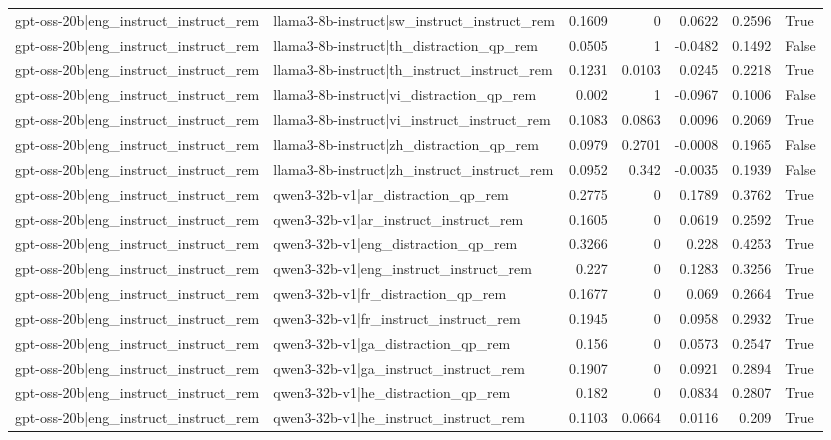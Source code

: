 \begin{table}
\begin{tabular}{l l r r r r l}
gpt-oss-20b|eng_instruct_instruct_rem & llama3-8b-instruct|sw_instruct_instruct_rem & 0.1609 & 0 & 0.0622 & 0.2596 & True \\
gpt-oss-20b|eng_instruct_instruct_rem & llama3-8b-instruct|th_distraction_qp_rem & 0.0505 & 1 & -0.0482 & 0.1492 & False \\
gpt-oss-20b|eng_instruct_instruct_rem & llama3-8b-instruct|th_instruct_instruct_rem & 0.1231 & 0.0103 & 0.0245 & 0.2218 & True \\
gpt-oss-20b|eng_instruct_instruct_rem & llama3-8b-instruct|vi_distraction_qp_rem & 0.002 & 1 & -0.0967 & 0.1006 & False \\
gpt-oss-20b|eng_instruct_instruct_rem & llama3-8b-instruct|vi_instruct_instruct_rem & 0.1083 & 0.0863 & 0.0096 & 0.2069 & True \\
gpt-oss-20b|eng_instruct_instruct_rem & llama3-8b-instruct|zh_distraction_qp_rem & 0.0979 & 0.2701 & -0.0008 & 0.1965 & False \\
gpt-oss-20b|eng_instruct_instruct_rem & llama3-8b-instruct|zh_instruct_instruct_rem & 0.0952 & 0.342 & -0.0035 & 0.1939 & False \\
gpt-oss-20b|eng_instruct_instruct_rem & qwen3-32b-v1|ar_distraction_qp_rem & 0.2775 & 0 & 0.1789 & 0.3762 & True \\
gpt-oss-20b|eng_instruct_instruct_rem & qwen3-32b-v1|ar_instruct_instruct_rem & 0.1605 & 0 & 0.0619 & 0.2592 & True \\
gpt-oss-20b|eng_instruct_instruct_rem & qwen3-32b-v1|eng_distraction_qp_rem & 0.3266 & 0 & 0.228 & 0.4253 & True \\
gpt-oss-20b|eng_instruct_instruct_rem & qwen3-32b-v1|eng_instruct_instruct_rem & 0.227 & 0 & 0.1283 & 0.3256 & True \\
gpt-oss-20b|eng_instruct_instruct_rem & qwen3-32b-v1|fr_distraction_qp_rem & 0.1677 & 0 & 0.069 & 0.2664 & True \\
gpt-oss-20b|eng_instruct_instruct_rem & qwen3-32b-v1|fr_instruct_instruct_rem & 0.1945 & 0 & 0.0958 & 0.2932 & True \\
gpt-oss-20b|eng_instruct_instruct_rem & qwen3-32b-v1|ga_distraction_qp_rem & 0.156 & 0 & 0.0573 & 0.2547 & True \\
gpt-oss-20b|eng_instruct_instruct_rem & qwen3-32b-v1|ga_instruct_instruct_rem & 0.1907 & 0 & 0.0921 & 0.2894 & True \\
gpt-oss-20b|eng_instruct_instruct_rem & qwen3-32b-v1|he_distraction_qp_rem & 0.182 & 0 & 0.0834 & 0.2807 & True \\
gpt-oss-20b|eng_instruct_instruct_rem & qwen3-32b-v1|he_instruct_instruct_rem & 0.1103 & 0.0664 & 0.0116 & 0.209 & True \\

\end{tabular}
\end{table}
